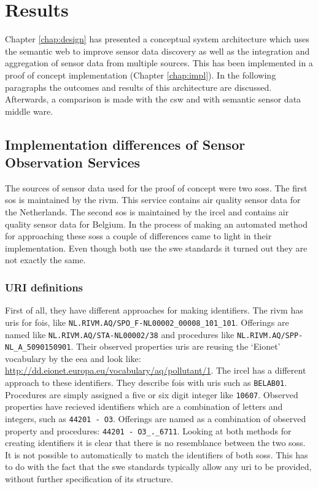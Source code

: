 

\chapter{Results}
\label{chap:results}

Chapter \ref{chap:design} has presented a conceptual system architecture which uses the semantic web to improve sensor data discovery as well as the integration and aggregation of sensor data from multiple sources. This has been implemented in a proof of concept implementation (Chapter \ref{chap:impl}). In the following paragraphs the outcomes and results of this architecture are discussed. Afterwards, a comparison is made with the \acf{csw} and with semantic sensor data middle ware. 

\section{Implementation differences of Sensor Observation Services}
\label{par:differences}
The sources of sensor data used for the proof of concept were two \aclp{sos}. The first \ac{sos} is maintained by the \acf{rivm}. This service contains air quality sensor data for the Netherlands. The second \ac{sos} is maintained by the \ac{ircel} and contains air quality sensor data for Belgium. In the process of making an automated method for approaching these \aclp{sos} a couple of differences came to light in their implementation. Even though both use the \ac{swe} standards it turned out they are not exactly the same. 

\subsection{URI definitions}
\begin{sloppypar}
	First of all, they have different approaches for making identifiers. The \ac{rivm} has \acp{uri} for \acp{foi}, like \texttt{NL.RIVM.AQ/SPO\_F-NL00002\_00008\_101\_101}. Offerings are named like \texttt{NL.RIVM.AQ/STA-NL00002/38} and procedures like \texttt{NL.RIVM.AQ/SPP-NL\_A\_5090150901}. Their observed properties \acp{uri} are reusing the `Eionet' vocabulary by the \ac{eea} and look like: \url{http://dd.eionet.europa.eu/vocabulary/aq/pollutant/1}. The \ac{ircel} has a different approach to these identifiers. They describe \acp{foi} with \acp{uri} such as \texttt{BELAB01}. Procedures are simply assigned a five or six digit integer like \texttt{10607}. Observed properties have recieved identifiers which are a combination of letters and integers, such as \texttt{44201 - O3}. Offerings are named as a combination of observed property and procedures: \texttt{44201 - O3\_.\_6711}. Looking at both methods for creating identifiers it is clear that there is no resemblance between the two \aclp{sos}. It is not possible to automatically to match the identifiers of both \aclp{sos}. This has to do with the fact that the \ac{swe} standards typically allow  any \ac{uri} to be provided, without further specification of its structure. 
\end{sloppypar}


